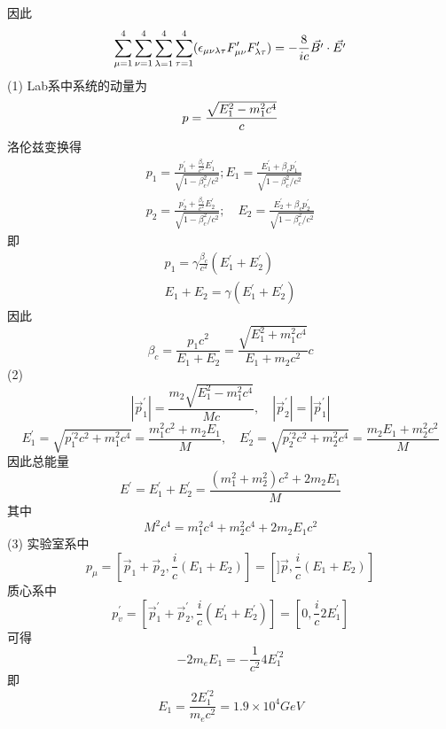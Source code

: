 \documentclass[UTF8,9pt]{ctexart}
\begin{document}
因此
$$\sum_{\mu=1}^4\sum_{\nu=1}^4\sum_{\lambda=1}^4\sum_{\tau=1}^4(\epsilon_{\mu \nu \lambda \tau} F'_{\mu \nu} F'_{\lambda \tau}) = -\frac{8}{ic}\vec{B'}\cdot\vec{E'}$$
(1) Lab系中系统的动量为
$$ p = \frac{\sqrt{E_1^2-m_1^2c^4}}{c}$$
洛伦兹变换得
$$ 
\begin{array}{l}{p_{1}=\frac{p_{1}^{\prime}+\frac{\beta_{c}}{c^{2}} E_{1}^{\prime}}{\sqrt{1-\beta_{c}^{2} / c^{2}}} ; E_{1}=\frac{E_{1}^{\prime}+\beta_{c} p_{1}^{\prime}}{\sqrt{1-\beta_{c}^{2} / c^{2}}}} \\ {p_{2}=\frac{p_{2}^{\prime}+\frac{\beta_{c}}{c^{2}} E_{2}^{\prime}}{\sqrt{1-\beta_{c}^{2} / c^{2}}} ; \quad E_{2}=\frac{E_{2}^{\prime}+\beta_{c} p_{2}^{\prime}}{\sqrt{1-\beta_{c}^{2} / c^{2}}}}\end{array}
 $$
即
$$ 
\begin{array}{c}{p_{1}=\gamma \frac{\beta_{c}}{c^{2}}\left(E_{1}^{\prime}+E_{2}^{\prime}\right)} \\ {E_{1}+E_{2}=\gamma\left(E_{1}^{\prime}+E_{2}^{\prime}\right)}\end{array}
 $$
因此$$ 
\beta_{c}=\frac{p_{1} c^{2}}{E_{1}+E_{2}}=\frac{\sqrt{E_{1}^{2}+m_{1}^{2} c^{4}}}{E_{1}+m_{2} c^{2}} c
 $$
 (2)$$ 
 \left|\vec{p}_{1}^{\prime}\right|=\frac{m_{2} \sqrt{E_{1}^{2}-m_{1}^{2} c^{4}}}{M c}, \quad\left|\vec{p}_{2}^{\prime}\right|=\left|\vec{p}_{1}^{\prime}\right|
  $$
  $$ 
E_{1}^{\prime}=\sqrt{p_{1}^{\prime 2} c^{2}+m_{1}^{2} c^{4}}=\frac{m_{1}^{2} c^{2}+m_{2} E_{1}}{M}, \quad E_{2}^{\prime}=\sqrt{p_{2}^{\prime 2} c^{2}+m_{2}^{2} c^{4}}=\frac{m_{2} E_{1}+m_{2}^{2} c^{2}}{M}
 $$
因此总能量$$ 
 E^{\prime}=E_{1}^{\prime}+E_{2}^{\prime}=\frac{\left(m_{1}^{2}+m_{2}^{2}\right) c^{2}+2 m_{2} E_{1}}{M}
  $$其中$$ 
  M^{2} c^{4}=m_{1}^{2} c^{4}+m_{2}^{2} c^{4}+2 m_{2} E_{1} c^{2}
   $$
(3) 实验室系中$$ 
p_{\mu}=\left[\vec{p}_{1}+\vec{p}_{2}, \frac{i}{c}\left(E_{1}+E_{2}\right)\right]=\left[]\vec{p}, \frac{i}{c}\left(E_{1}+E_{2}\right)\right]
$$质心系中$$ 
p_{v}^{\prime}=\left[\vec{p}_{1}^{\prime}+\vec{p}_{2}^{\prime}, \frac{i}{c}\left(E_{1}^{\prime}+E_{2}^{\prime}\right)\right]=\left[0, \frac{i}{c} 2 E_{1}^{\prime}\right]
$$
可得$$ 
-2 m_{e} E_{1}=-\frac{1}{c^{2}} 4 E_{1}^{\prime 2}
 $$
 即
 $$ 
E_{1}=\frac{2 E_{1}^{\prime 2}}{m_{e} c^{2}}=1.9 \times 10^{4} G e V
 $$
\end{document}
